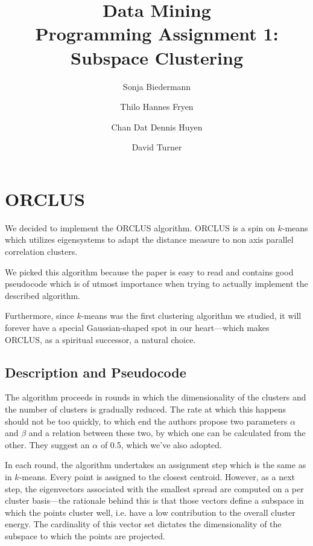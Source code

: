 \documentclass[english]{scrartcl}
\begin{document}
\title{Data Mining\\Programming Assignment 1: Subspace Clustering}

\author{Sonja Biedermann \and Thilo Hannes Fryen \and Chan Dat Dennis Huyen \and David Turner}

\maketitle
\tableofcontents

\section{ORCLUS}

We decided to implement the ORCLUS algorithm. ORCLUS is a spin on $k$-means
which utilizes eigensystems to adapt the distance measure to non axis parallel
correlation clusters.

We picked this algorithm because the paper is easy to read and contains good
pseudocode which is of utmost importance when trying to actually implement
the described algorithm.

Furthermore, since $k$-means was the first clustering algorithm we studied, it will forever
have a special Gaussian-shaped spot in our heart---which makes ORCLUS, as a
spiritual successor, a natural choice.

\subsection{Description and Pseudocode}

The algorithm proceeds in rounds in which the dimensionality of the clusters
and the number of clusters is gradually reduced. The rate at which this happens should
not be too quickly, to which end the authors propose two parameters $\alpha$ and $\beta$
and a relation between these two, by which one can be calculated from the other. They
suggest an $\alpha$ of 0.5, which we've also adopted.

In each round, the algorithm undertakes an assignment step which is the same as
in $k$-means. Every point is assigned to the closest centroid. However, as a
next step, the eigenvectors associated with the smallest spread are computed on
a per cluster basis---the rationale behind this is that those vectors define a
subspace in which the points cluster well, i.e. have a low contribution to the
overall cluster energy. The cardinality of this vector set dictates the dimensionality
of the subspace to which the points are projected.
\end{document}
